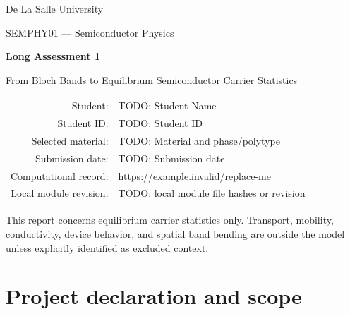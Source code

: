 \documentclass[11pt,a4paper]{article}
\newcommand{\studentname}{TODO: Student Name}
\newcommand{\studentid}{TODO: Student ID}
\newcommand{\materialname}{TODO: Material and phase/polytype}
\newcommand{\submissiondate}{TODO: Submission date}
\newcommand{\repositoryurl}{https://example.invalid/replace-me}
\newcommand{\localmoduleversion}{TODO: local module file hashes or revision}
\begin{document}
\begin{titlepage}
  \centering
  {\Large De La Salle University\par}
  \vspace{8mm}
  {\large SEMPHY01 --- Semiconductor Physics\par}
  \vspace{18mm}
  {\Huge\bfseries Long Assessment 1\par}
  \vspace{4mm}
  {\LARGE From Bloch Bands to Equilibrium Semiconductor Carrier Statistics\par}
  \vspace{18mm}

  \begin{tabular}{@{}rl@{}}
    Student: & \studentname \\
    Student ID: & \studentid \\
    Selected material: & \materialname \\
    Submission date: & \submissiondate \\
    Computational record: & \url{\repositoryurl} \\
    Local module revision: & \localmoduleversion
  \end{tabular}

  \vfill
  \begin{minipage}{0.88\textwidth}
    \small
    This report concerns equilibrium carrier statistics only. Transport,
    mobility, conductivity, device behavior, and spatial band bending are
    outside the model unless explicitly identified as excluded context.
  \end{minipage}
\end{titlepage}

\tableofcontents
\clearpage
{}

\section{Project declaration and scope}
\label{sec:declaration}
\end{document}
